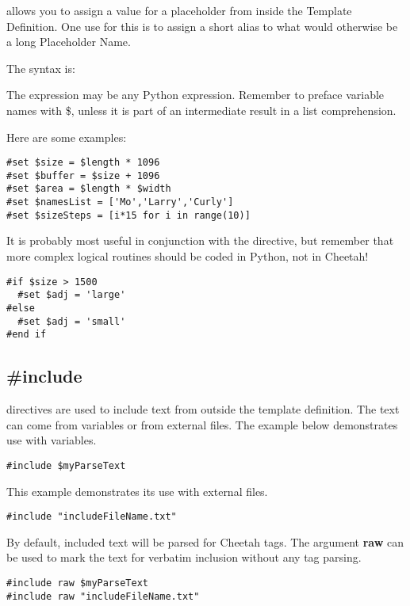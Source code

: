  allows you to assign a value for a placeholder from inside the
Template Definition.  One use for this is to assign a short alias to what would
otherwise be a long Placeholder Name. 

The syntax is: 

The expression may be any Python expression. Remember to preface variable names
with \$, unless it is part of an intermediate result in a list comprehension.

Here are some examples:
\begin{verbatim}
#set $size = $length * 1096
#set $buffer = $size + 1096
#set $area = $length * $width
#set $namesList = ['Mo','Larry','Curly']
#set $sizeSteps = [i*15 for i in range(10)]
\end{verbatim}

It is probably most useful in conjunction with the  directive, but
remember that more complex logical routines should be coded in Python, not in
Cheetah!
\begin{verbatim}
#if $size > 1500
  #set $adj = 'large'
#else
  #set $adj = 'small'
#end if
\end{verbatim}


\subsection{\#include}
\label{directives.include}

 directives are used to include text from outside the template
definition.  The text can come from  variables or from
external files.  The example below demonstrates use with 
variables.

\begin{verbatim}
#include $myParseText
\end{verbatim}

This example demonstrates its use with external files.
\begin{verbatim}
#include "includeFileName.txt"
\end{verbatim}

By default, included text will be parsed for Cheetah tags.  The argument
{\bf raw} can be used to mark the text for verbatim inclusion without any tag
parsing.

\begin{verbatim}
#include raw $myParseText
#include raw "includeFileName.txt"
\end{verbatim}

